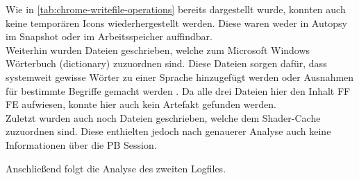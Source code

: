 \begin{appendices}
{\begin{landscape}
\begin{table}[h!]
{\begin{tabular}{cllll}
				\end{tabular}
}
\end{table}
\end{landscape}
}
\restoregeometry
\begin{sloppypar}

Wie in \autoref{tab:chrome-writefile-operations} bereits dargestellt wurde, konnten auch keine temporären Icons wiederhergestellt werden. Diese waren weder in Autopsy im Snapshot oder im Arbeitsspeicher auffindbar. \\
Weiterhin wurden Dateien geschrieben, welche zum Microsoft Windows Wörterbuch (dictionary) zuzuordnen sind. Diese Dateien sorgen dafür, dass systemweit gewisse Wörter zu einer Sprache hinzugefügt werden oder Ausnahmen für bestimmte Begriffe gemacht werden \cite{DictionaryWin10Files}. Da alle drei Dateien hier den Inhalt \glqq{}FF FE\grqq{} aufwiesen, konnte hier auch kein Artefakt gefunden werden.\\
Zuletzt wurden auch noch Dateien geschrieben, welche dem Shader-Cache zuzuordnen sind. Diese enthielten jedoch nach genauerer Analyse auch keine Informationen über die PB Session.\end{sloppypar}

Anschließend folgt die Analyse des zweiten Logfiles.

\end{appendices}
